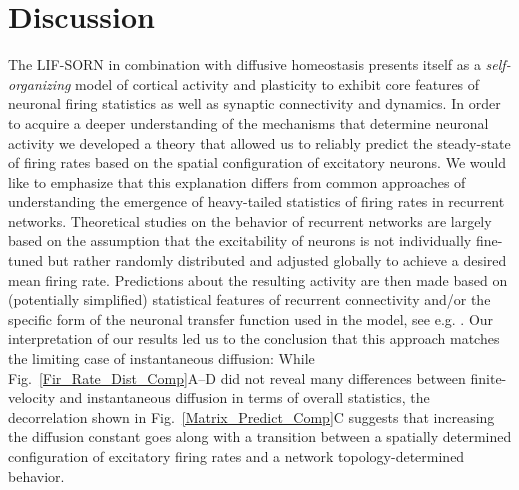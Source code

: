 \documentclass[10pt,letterpaper]{article}
\begin{document}
\section*{Discussion}
The LIF-SORN in combination with diffusive homeostasis presents itself as a \emph{self-organizing} model of cortical activity and plasticity to exhibit core features of neuronal firing statistics as well as synaptic connectivity and dynamics. In order to acquire a deeper understanding of the mechanisms that determine neuronal activity we developed a theory that allowed us to reliably predict the steady-state of firing rates based on the spatial configuration of excitatory neurons. We would like to emphasize that this explanation differs from common approaches of understanding the emergence of heavy-tailed statistics of firing rates in recurrent networks. Theoretical studies on the behavior of recurrent networks are largely based on the assumption that the excitability of neurons is not individually fine-tuned but rather randomly distributed and adjusted globally to achieve a desired mean firing rate. Predictions about the resulting activity are then made based on (potentially simplified) statistical features of recurrent connectivity and/or the specific form of the neuronal transfer function used in the model, see e.g. \cite{Roxin_Firing_Rate_Distribution,Vreeswijk1998,Koulakov_2009}. Our interpretation of our results led us to the conclusion that this approach matches the limiting case of instantaneous diffusion: While Fig.~\ref{Fir_Rate_Dist_Comp}A--D did not reveal many differences between finite-velocity and instantaneous diffusion in terms of overall statistics, the decorrelation shown in Fig.~\ref{Matrix_Predict_Comp}C suggests that increasing the diffusion constant goes along with a transition between a spatially determined configuration of excitatory firing rates and a network topology-determined behavior.
\end{document}
